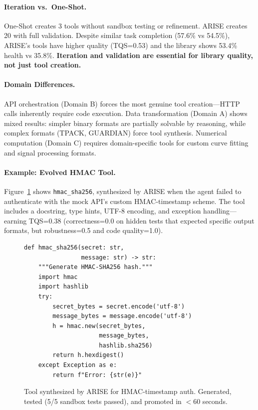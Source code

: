 \documentclass[10pt,twocolumn]{article}
\begin{document}
\paragraph{Iteration vs.\ One-Shot.} One-Shot creates 3 tools without sandbox testing or refinement. ARISE creates 20 with full validation. Despite similar task completion (57.6\% vs 54.5\%), ARISE's tools have higher quality (TQS=0.53) and the library shows 53.4\% health vs 35.8\%. \textbf{Iteration and validation are essential for library quality, not just tool creation.}

\paragraph{Domain Differences.} API orchestration (Domain B) forces the most genuine tool creation---HTTP calls inherently require code execution. Data transformation (Domain A) shows mixed results: simpler binary formats are partially solvable by reasoning, while complex formats (TPACK, GUARDIAN) force tool synthesis. Numerical computation (Domain C) requires domain-specific tools for custom curve fitting and signal processing formats.

\paragraph{Example: Evolved HMAC Tool.} Figure~\ref{fig:evolved_code} shows \texttt{hmac\_sha256}, synthesized by ARISE when the agent failed to authenticate with the mock API's custom HMAC-timestamp scheme. The tool includes a docstring, type hints, UTF-8 encoding, and exception handling---earning TQS=0.38 (correctness=0.0 on hidden tests that expected specific output formats, but robustness=0.5 and code quality=1.0).

\begin{figure}[t]
\centering
\footnotesize
\begin{verbatim}
def hmac_sha256(secret: str,
                message: str) -> str:
    """Generate HMAC-SHA256 hash."""
    import hmac
    import hashlib
    try:
        secret_bytes = secret.encode('utf-8')
        message_bytes = message.encode('utf-8')
        h = hmac.new(secret_bytes,
                     message_bytes,
                     hashlib.sha256)
        return h.hexdigest()
    except Exception as e:
        return f"Error: {str(e)}"
\end{verbatim}
\caption{Tool synthesized by ARISE for HMAC-timestamp auth. Generated, tested (5/5 sandbox tests passed), and promoted in $<$60 seconds.}
\label{fig:evolved_code}
\end{figure}
\end{document}
